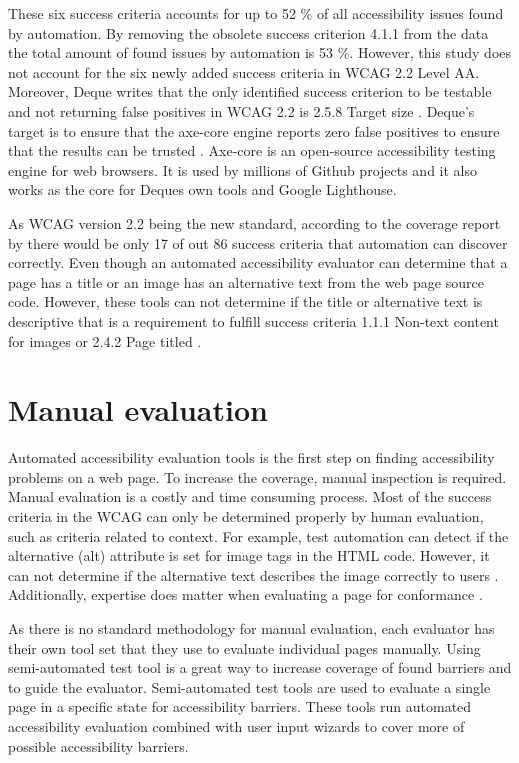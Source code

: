 These six success criteria accounts for up to 52 \% of all accessibility issues found by automation. By removing the obsolete success criterion 4.1.1 from the data the total amount of found issues by automation is 53 \%. However, this study does not account for the six newly added success criteria in WCAG 2.2 Level AA. Moreover, Deque writes that the only identified success criterion to be testable and not returning false positives in WCAG 2.2 is 2.5.8 Target size \citep{dequeaxe4_5}. Deque's target is to ensure that the axe-core engine reports zero false positives to ensure that the results can be trusted \citep{dequecoverage}. Axe-core is an open-source accessibility testing engine for web browsers. It is used by millions of Github projects and it also works as the core for Deques own tools and Google Lighthouse. 

As WCAG version 2.2 being the new standard, according to the coverage report by \textcite{dequecoverage} there would be only 17 of out 86 success criteria that automation can discover correctly. Even though an automated accessibility evaluator can determine that a page has a title or an image has an alternative text from the web page source code. However, these tools can not determine if the title or alternative text is descriptive that is a requirement to fulfill success criteria 1.1.1 Non-text content for images or 2.4.2 Page titled \citep{wcag_checklist}.

\section{Manual evaluation}

Automated accessibility evaluation tools is the first step on finding accessibility problems on a web page. To increase the coverage, manual inspection is required. Manual evaluation is a costly and time consuming process. Most of the success criteria in the WCAG can only be determined properly by human evaluation, such as criteria related to context. For example, test automation can detect if the alternative (alt) attribute is set for image tags in the HTML code. However, it can not determine if the alternative text describes the image correctly to users \citep{comparison_10.1145/3371300.3383346}. Additionally, expertise does matter when evaluating a page for conformance \citep{10.1145/1878803.1878813_testability_expertise, comparative_accessibility_methods}.

As there is no standard methodology for manual evaluation, each evaluator has their own tool set that they use to evaluate individual pages manually. Using semi-automated test tool is a great way to increase coverage of found barriers and to guide the evaluator. Semi-automated test tools are used to evaluate a single page in a specific state for accessibility barriers. These tools run automated accessibility evaluation combined with user input wizards to cover more of possible accessibility barriers. 

